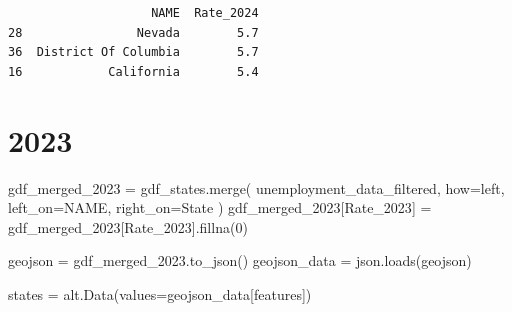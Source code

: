 \documentclass[
  letterpaper,
  DIV=11,
  numbers=noendperiod]{scrartcl}
\newenvironment{Shaded}{\begin{snugshade}}{\end{snugshade}}
\newcommand{\DecValTok}[1]{\textcolor[rgb]{0.68,0.00,0.00}{#1}}
\newcommand{\NormalTok}[1]{\textcolor[rgb]{0.00,0.23,0.31}{#1}}
\newcommand{\OperatorTok}[1]{\textcolor[rgb]{0.37,0.37,0.37}{#1}}
\newcommand{\StringTok}[1]{\textcolor[rgb]{0.13,0.47,0.30}{#1}}
\begin{document}
\begin{verbatim}
                    NAME  Rate_2024
28                Nevada        5.7
36  District Of Columbia        5.7
16            California        5.4
\end{verbatim}

\section{2023}\label{section-1}

\begin{Shaded}
\begin{Highlighting}[]
\NormalTok{gdf\_merged\_2023 }\OperatorTok{=}\NormalTok{ gdf\_states.merge(}
\NormalTok{    unemployment\_data\_filtered, how}\OperatorTok{=}\StringTok{\textquotesingle{}left\textquotesingle{}}\NormalTok{, left\_on}\OperatorTok{=}\StringTok{\textquotesingle{}NAME\textquotesingle{}}\NormalTok{, right\_on}\OperatorTok{=}\StringTok{\textquotesingle{}State\textquotesingle{}}
\NormalTok{)}
\NormalTok{gdf\_merged\_2023[}\StringTok{\textquotesingle{}Rate\_2023\textquotesingle{}}\NormalTok{] }\OperatorTok{=}\NormalTok{ gdf\_merged\_2023[}\StringTok{\textquotesingle{}Rate\_2023\textquotesingle{}}\NormalTok{].fillna(}\DecValTok{0}\NormalTok{)}

\NormalTok{geojson }\OperatorTok{=}\NormalTok{ gdf\_merged\_2023.to\_json()}
\NormalTok{geojson\_data }\OperatorTok{=}\NormalTok{ json.loads(geojson)}

\NormalTok{states }\OperatorTok{=}\NormalTok{ alt.Data(values}\OperatorTok{=}\NormalTok{geojson\_data[}\StringTok{\textquotesingle{}features\textquotesingle{}}\NormalTok{])}


\end{Highlighting}
\end{Shaded}
\end{document}
